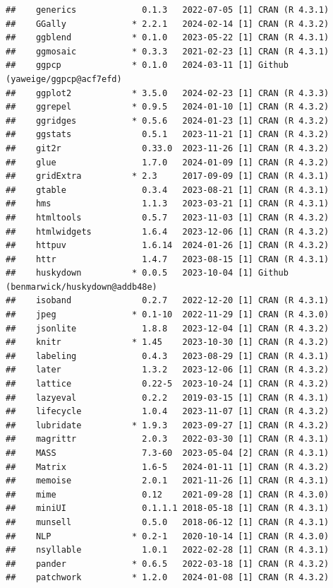 \documentclass[print]{nuthesis}
\begin{document}
\begin{verbatim}
##    generics             0.1.3   2022-07-05 [1] CRAN (R 4.3.1)
##    GGally             * 2.2.1   2024-02-14 [1] CRAN (R 4.3.2)
##    ggblend            * 0.1.0   2023-05-22 [1] CRAN (R 4.3.1)
##    ggmosaic           * 0.3.3   2021-02-23 [1] CRAN (R 4.3.1)
##    ggpcp              * 0.1.0   2024-03-11 [1] Github (yaweige/ggpcp@acf7efd)
##    ggplot2            * 3.5.0   2024-02-23 [1] CRAN (R 4.3.3)
##    ggrepel            * 0.9.5   2024-01-10 [1] CRAN (R 4.3.2)
##    ggridges           * 0.5.6   2024-01-23 [1] CRAN (R 4.3.2)
##    ggstats              0.5.1   2023-11-21 [1] CRAN (R 4.3.2)
##    git2r                0.33.0  2023-11-26 [1] CRAN (R 4.3.2)
##    glue                 1.7.0   2024-01-09 [1] CRAN (R 4.3.2)
##    gridExtra          * 2.3     2017-09-09 [1] CRAN (R 4.3.1)
##    gtable               0.3.4   2023-08-21 [1] CRAN (R 4.3.1)
##    hms                  1.1.3   2023-03-21 [1] CRAN (R 4.3.1)
##    htmltools            0.5.7   2023-11-03 [1] CRAN (R 4.3.2)
##    htmlwidgets          1.6.4   2023-12-06 [1] CRAN (R 4.3.2)
##    httpuv               1.6.14  2024-01-26 [1] CRAN (R 4.3.2)
##    httr                 1.4.7   2023-08-15 [1] CRAN (R 4.3.1)
##    huskydown          * 0.0.5   2023-10-04 [1] Github (benmarwick/huskydown@addb48e)
##    isoband              0.2.7   2022-12-20 [1] CRAN (R 4.3.1)
##    jpeg               * 0.1-10  2022-11-29 [1] CRAN (R 4.3.0)
##    jsonlite             1.8.8   2023-12-04 [1] CRAN (R 4.3.2)
##    knitr              * 1.45    2023-10-30 [1] CRAN (R 4.3.2)
##    labeling             0.4.3   2023-08-29 [1] CRAN (R 4.3.1)
##    later                1.3.2   2023-12-06 [1] CRAN (R 4.3.2)
##    lattice              0.22-5  2023-10-24 [1] CRAN (R 4.3.2)
##    lazyeval             0.2.2   2019-03-15 [1] CRAN (R 4.3.1)
##    lifecycle            1.0.4   2023-11-07 [1] CRAN (R 4.3.2)
##    lubridate          * 1.9.3   2023-09-27 [1] CRAN (R 4.3.2)
##    magrittr             2.0.3   2022-03-30 [1] CRAN (R 4.3.1)
##    MASS                 7.3-60  2023-05-04 [2] CRAN (R 4.3.1)
##    Matrix               1.6-5   2024-01-11 [1] CRAN (R 4.3.2)
##    memoise              2.0.1   2021-11-26 [1] CRAN (R 4.3.1)
##    mime                 0.12    2021-09-28 [1] CRAN (R 4.3.0)
##    miniUI               0.1.1.1 2018-05-18 [1] CRAN (R 4.3.1)
##    munsell              0.5.0   2018-06-12 [1] CRAN (R 4.3.1)
##    NLP                * 0.2-1   2020-10-14 [1] CRAN (R 4.3.0)
##    nsyllable            1.0.1   2022-02-28 [1] CRAN (R 4.3.1)
##    pander             * 0.6.5   2022-03-18 [1] CRAN (R 4.3.2)
##    patchwork          * 1.2.0   2024-01-08 [1] CRAN (R 4.3.2)

\end{verbatim}
\end{document}
